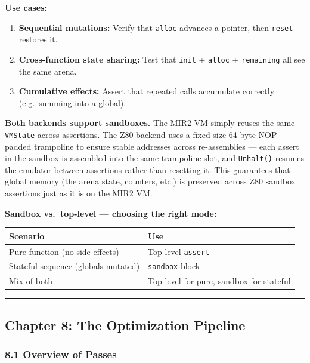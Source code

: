 \documentclass[
  11pt,
]{article}
\providecommand{\tightlist}{%
  \setlength{\itemsep}{0pt}\setlength{\parskip}{0pt}}
\begin{document}
\textbf{Use cases:}

\begin{enumerate}
\def\labelenumi{\arabic{enumi}.}
\tightlist
\item
  \textbf{Sequential mutations:} Verify that \texttt{alloc} advances a
  pointer, then \texttt{reset} restores it.
\item
  \textbf{Cross-function state sharing:} Test that \texttt{init} +
  \texttt{alloc} + \texttt{remaining} all see the same arena.
\item
  \textbf{Cumulative effects:} Assert that repeated calls accumulate
  correctly (e.g.~summing into a global).
\end{enumerate}

\textbf{Both backends support sandboxes.} The MIR2 VM simply reuses the
same \texttt{VMState} across assertions. The Z80 backend uses a
fixed-size 64-byte NOP-padded trampoline to ensure stable addresses
across re-assemblies --- each assert in the sandbox is assembled into
the same trampoline slot, and \texttt{Unhalt()} resumes the emulator
between assertions rather than resetting it. This guarantees that global
memory (the arena state, counters, etc.) is preserved across Z80 sandbox
assertions just as it is on the MIR2 VM.

\textbf{Sandbox vs.~top-level --- choosing the right mode:}

\begin{longtable}[]{@{}ll@{}}
\toprule\noalign{}
Scenario & Use \\
\midrule\noalign{}
\endhead
\bottomrule\noalign{}
\endlastfoot
Pure function (no side effects) & Top-level \texttt{assert} \\
Stateful sequence (globals mutated) & \texttt{sandbox} block \\
Mix of both & Top-level for pure, sandbox for stateful \\
\end{longtable}

\begin{center}\rule{0.5\linewidth}{0.5pt}\end{center}

\hypertarget{chapter-8-the-optimization-pipeline}{%
\subsection{Chapter 8: The Optimization
Pipeline}\label{chapter-8-the-optimization-pipeline}}

\hypertarget{overview-of-passes}{%
\subsubsection{8.1 Overview of Passes}\label{overview-of-passes}}
\end{document}
